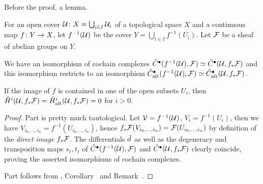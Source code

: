\documentclass[a4paper,parskip=half,numbers=enddot, DIV=12]{scrreprt}
\begin{document}
Before the proof, a lemma.
\begin{lem}
	For an open cover $\mathcal{U}\colon X=\bigcup_{i\in I}\mathcal{U}_i$ of a topological space $X$ and a continuous map $f\colon Y\morphism X$, let $f^{-1}(\mathcal{U})$ be the cover $Y=\bigcup_{i\in I}f^{-1}(U_i)$. Let $\mathcal{F}$ be a sheaf of abelian groups on $Y$.
	\begin{alphanumerate}
		\item We have an isomorphism of cochain complexes $\check{C}^\bullet (f^{-1}(\mathcal{U}),\mathcal{F})\simeq \check{C}^\bullet (\mathcal{U},f_*\mathcal{F})$ and this isomorphism restricts to an isomorphism $\check{C}_{\mathrm{alt}}^\bullet (f^{-1}(\mathcal{U}),\mathcal{F})\simeq \check{C}_{\mathrm{alt}}^\bullet (\mathcal{U},f_*\mathcal{F})$.
		\item If the image of $f$ is contained in one of the open subsets $U_i$, then $\check{H}^i(\mathcal{U},f_*\mathcal{F})=\check{H}_{\mathrm{alt}}^i(\mathcal{U},f_*\mathcal{F})=0$ for $i>0$.
	\end{alphanumerate}
\end{lem}
\begin{proof}
	Part  is pretty much tautological. Let $\mathcal{V}=f^{-1}(\mathcal{U})$, $V_i=f^{-1}(U_i)$, then we have $V_{i_0,\ldots,i_n}=f^{-1}(U_{i_0,\ldots,i_n})$, hence $f_*\mathcal{F}(V_{i_0,\ldots,i_n})=\mathcal{F}(U_{i_0,\ldots,i_n})$ by definition of the \emph{direct image} $f_*\mathcal{F}$. The differentials $\check{d}\hspace{0.06125em}$ as well as the degeneracy and transposition maps $s_\ell,t_\ell$ of $\check{C}^\bullet (f^{-1}(\mathcal{U}),\mathcal{F})$ and $\check{C}^\bullet (\mathcal{U},f_*\mathcal{F})$ clearly coincide, proving the asserted isomorphisms of cochain complexes.
	
	Part  follows from , Corollary~ and Remark~.
\end{proof}
\end{document}
